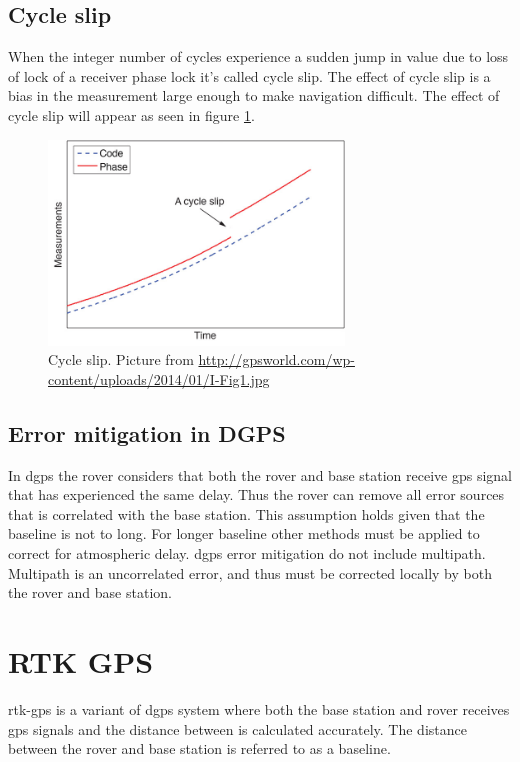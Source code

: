 \subsection{Cycle slip}\label{ss:cycleSlip}
When the integer number of cycles experience a sudden jump in value due to loss of lock of a receiver phase lock it's called cycle slip. The effect of cycle slip is a bias in the measurement large enough to make navigation difficult. The effect of cycle slip will appear as seen in figure \ref{figure:CycleSlip}.
\begin{figure}[H]
	\centering
		\includegraphics[width=0.7\textwidth]{figs/cycleSlip.jpg}
		\caption{Cycle slip. Picture from \url{http://gpsworld.com/wp-content/uploads/2014/01/I-Fig1.jpg}}
		\label{figure:CycleSlip}
\end{figure}
\subsection{Error mitigation in DGPS} \label{ss: Error mitigation DGPS}
In \gls{dgps} the rover considers that both the rover and base station receive \gls{gps} signal that has experienced the same delay. Thus the rover can remove all error sources that is correlated with the base station. This assumption holds given that the baseline is not to long. For longer baseline other methods must be applied to correct for atmospheric delay. \gls{dgps} error mitigation do not include multipath. Multipath is an uncorrelated error, and thus must be corrected locally by both the rover and base station.


\section{RTK GPS}\label{ss:rtk-gps}
\acrfull{rtk-gps} is a variant of \gls{dgps} system where both the base station and rover receives \gls{gps} signals and the distance between is calculated accurately. The distance between the rover and base station is referred to as a baseline.

